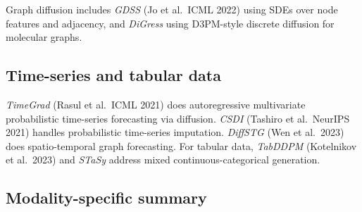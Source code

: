Graph diffusion includes \emph{GDSS} (Jo et al.~ICML 2022) using SDEs over node features and adjacency, and \emph{DiGress} using D3PM-style discrete diffusion for molecular graphs.

\subsection{Time-series and tabular data}\label{time-series-and-tabular-data}

\emph{TimeGrad} (Rasul et al.~ICML 2021) does autoregressive multivariate probabilistic time-series forecasting via diffusion. \emph{CSDI} (Tashiro et al.~NeurIPS 2021) handles probabilistic time-series imputation. \emph{DiffSTG} (Wen et al.~2023) does spatio-temporal graph forecasting. For tabular data, \emph{TabDDPM} (Kotelnikov et al.~2023) and \emph{STaSy} address mixed continuous-categorical generation.

\subsection{Modality-specific summary}\label{modality-specific-summary}

